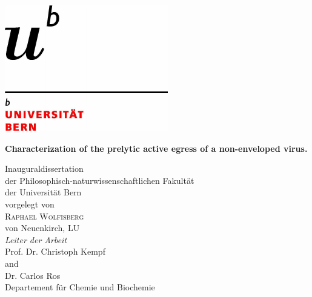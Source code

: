 \documentclass[11pt, titlepage, a4paper, twoside, onecolumn, DIV=calc]{scrbook} %
\begin{document}





\setlength{\footskip}{35mm}


\captionsetup[table]{singlelinecheck=off} %




\begin{titlepage}
\begin{flushright}
\includegraphics[scale=0.3, trim= 1mm 1mm 5mm 20mm]{logo} \\[1.4 cm]
\end{flushright}
\begin{center}
\begin{spacing}{2.5}
{\Huge \bfseries Characterization of the prelytic active egress of a non-enveloped virus.} \\[1.7 cm]
\end{spacing}
{\Large Inauguraldissertation \\
der Philosophisch-naturwissenschaftlichen Fakultät \\
der Universität Bern \\[1.7cm]
{\large vorgelegt von}\\[0.3 cm]
{\LARGE \textsc{Raphael Wolfisberg}} \\[0.3 cm] 
{\large von Neuenkirch, LU} \\ [2 cm]
{\Large \emph{Leiter der Arbeit}\\ [0.3 cm]
{\textsc Prof. Dr. Christoph Kempf} \\
and \\
{\textsc Dr. Carlos Ros} \\ [0.9 cm]
Departement für Chemie und Biochemie}}
\end{center}
\end{titlepage}
\end{document}
